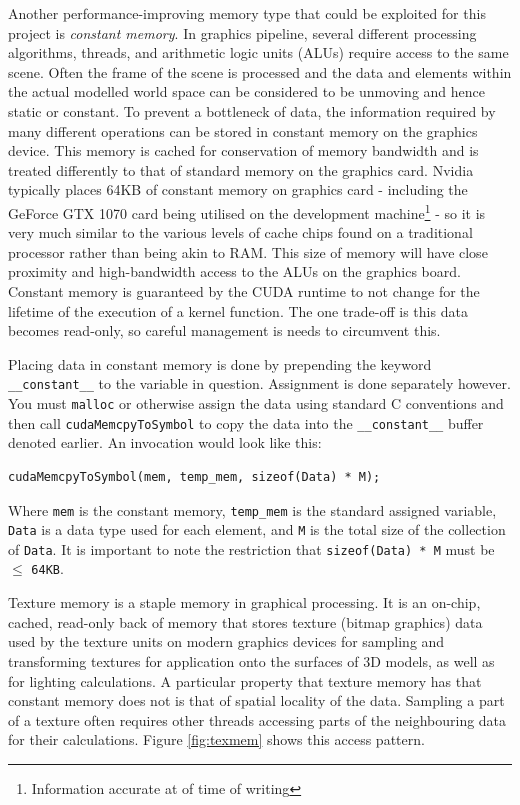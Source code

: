 \documentclass[conference]{IEEEtran}
\begin{document}
Another performance-improving memory type that could be exploited for this project is \textit{constant memory}. In graphics pipeline, several different processing algorithms, threads, and arithmetic logic units (ALUs) require access to the same scene. Often the frame of the scene is processed and the data and elements within the actual modelled world space can be considered to be unmoving and hence static or constant. To prevent a bottleneck of data, the information required by many different operations can be stored in constant memory on the graphics device. This memory is cached for conservation of memory bandwidth and is treated differently to that of standard memory on the graphics card. Nvidia typically places 64KB of constant memory on graphics card - including the GeForce GTX 1070 card being utilised on the development machine\footnote{Information accurate at of time of writing} - so it is very much similar to the various levels of cache chips found on a traditional processor rather than being akin to RAM. This size of memory will have close proximity and high-bandwidth access to the ALUs on the graphics board. Constant memory is guaranteed by the CUDA runtime to not change for the lifetime of the execution of a kernel function. The one trade-off is this data becomes read-only, so careful management is needs to circumvent this.

Placing data in constant memory is done by prepending the keyword \texttt{\_\_constant\_\_} to the variable in question. Assignment is done separately however. You must \texttt{malloc} or otherwise assign the data using standard C conventions and then call \texttt{cudaMemcpyToSymbol} to copy the data into the \texttt{\_\_constant\_\_} buffer denoted earlier. An invocation would look like this:

\begin{lstlisting}[breaklines]
    cudaMemcpyToSymbol(mem, temp_mem, sizeof(Data) * M);
\end{lstlisting}

Where \texttt{mem} is the constant memory, \texttt{temp\_mem} is the standard assigned variable, \texttt{Data} is a data type used for each element, and \texttt{M} is the total size of the collection of \texttt{Data}. It is important to note the restriction that \texttt{sizeof(Data) * M} must be $\leq$ \texttt{64KB}.

Texture memory is a staple memory in graphical processing. It is an on-chip, cached, read-only back of memory that stores texture (bitmap graphics) data used by the texture units on modern graphics devices for sampling and transforming textures for application onto the surfaces of 3D models, as well as for lighting calculations. A particular property that texture memory has that constant memory does not is that of spatial locality of the data. Sampling a part of a texture often requires other threads accessing parts of the neighbouring data for their calculations. Figure \ref{fig:texmem} shows this access pattern.
\end{document}
